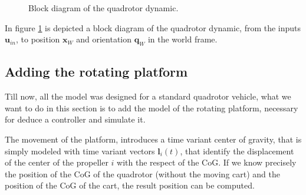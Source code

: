 \begin{figure}[h]
	\caption{Block diagram of the quadrotor dynamic.}
	\label{fig:quadDynBlock}
\end{figure}

\noindent In figure \ref{fig:quadDynBlock} is depicted a block diagram of the quadrotor dynamic, from the inputs $\mathbf{u}_{in}$, to position $\mathbf{x}_W$ and orientation $\mathbf{q}_W$ in the world frame.

\subsection{Adding the rotating platform}
\label{addPlatform}

Till now, all the model was designed for a standard quadrotor vehicle, what we want to do in this section is to add the model of the rotating platform, necessary for deduce a controller and simulate it.

\noindent The movement of the platform, introduces a time variant center of gravity, that is simply modeled with time variant vectors $\mathbf{l}_i(t)$, that identify the displacement of the center of the propeller $i$ with the respect of the CoG. If we know precisely the position of the CoG of the quadrotor (without the moving cart) and the position of the CoG of the cart, the result position can be computed.


